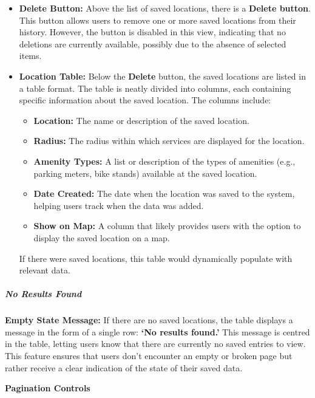 \begin{itemize}
    \item{} \textbf{Delete Button:} Above the list of saved locations, there is a \textbf{Delete button}. This button allows users to remove one or more saved locations from their history. However, the button is disabled in this view, indicating that no deletions are currently available, possibly due to the absence of selected items.
    \item{} \textbf{Location Table:} Below the \textbf{Delete} button, the saved locations are listed in a table format. The table is neatly divided into columns, each containing specific information about the saved location. The columns include:
    \begin{itemize}
        \item{} \textbf{Location:} The name or description of the saved location.
        \item{} \textbf{Radius:} The radius within which services are displayed for the location.
        \item{} \textbf{Amenity Types:} A list or description of the types of amenities (e.g., parking meters, bike stands) available at the saved location.
        \item{} \textbf{Date Created:} The date when the location was saved to the system, helping users track when the data was added.
        \item{} \textbf{Show on Map:} A column that likely provides users with the option to display the saved location on a map.
    \end{itemize}

    If there were saved locations, this table would dynamically populate with relevant data.

\end{itemize}

\subparagraph{No Results Found}\mbox{}

\textbf{Empty State Message:} If there are no saved locations, the table displays a message in the form of a single row: \textbf{`No results found.'} This message is centred in the table, letting users know that there are currently no saved entries to view. This feature ensures that users don’t encounter an empty or broken page but rather receive a clear indication of the state of their saved data.

\textbf{Pagination Controls}

